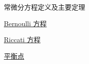 \begin{denotation}{常微分方程定义及主要定理}
	\item[]   \hyperref[Bernoulli]{Bernoulli 方程}
	\item[]   \hyperref[Riccati]{Riccati 方程}
	\item[] \hyperref[平衡点]{平衡点}
\end{denotation}